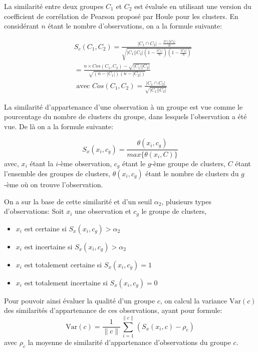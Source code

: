 \documentclass[12pt, french, latin.medieval, a4paper]{report}
\begin{document}
	La similarité entre deux groupes $C_1$ et $C_2$ est évaluée en utilisant une version du coefficient de corrélation de Pearson proposé par Houle \cite{houle2008relevant} pour les clusters.  
	En considérant $n$ étant le nombre d'observations, on a la formule suivante:
    
	\begin{equation}
    	\begin{split}
        	& S_c(C_1,C_2) = \frac{ | C_1 \cap C_2 | - \frac{| C_1 | | C_2 |}{n} }{\sqrt{ | C_1 | | C_2 | \left( 1 - \frac{| C_1 |}{n} \right)\left( 1 - \frac{| C_2 |}{n} \right) }}
        	\\
        	& = \frac{ n \times Cos(C_1 , C_2) - \sqrt{| C_1 | | C_2 |} }{\sqrt{ \left( n - | C_1 | \right)\left( n - | C_2 | \right) }}
        	\\
        	& \text{ avec $Cos(C_1, C_2) = \frac{| C_1 \cap C_2 |}{ \sqrt{| C_1 | | C_2 |} }$}
    	\end{split}
    	\label{equa:ace1}
	\end{equation}

	La similarité d'appartenance d'une observation à un groupe est vue comme le pourcentage du nombre de clusters du groupe, dans lesquels l'observation a été vue.
	De là on a la formule suivante:
   	 
	\begin{equation}
    	S_x(x_i,c_g) = \frac{\theta(x_i, c_g)}{ max\{ \theta(x_i, C) \} }
    	\label{equa:ace2}
	\end{equation}
	avec, $x_i$ étant la $i$-ème observation, $c_g$ étant le $g$-ème groupe de clusters, $C$ étant l'ensemble des groupes de clusters, $\theta(x_i, c_g)$ étant le nombre de clusters du $g$-ème où on trouve l'observation.

	On a sur la base de cette similarité et d'un seuil $\alpha_2$, plusieurs types d'observations:
	Soit $x_i$ une observation et $c_g$ le groupe de clusters,
	\begin{itemize}
    	\item $x_i$ est certaine si $S_x(x_i,c_g) > \alpha_2$
    	\item $x_i$ est incertaine si $S_x(x_i,c_g) > \alpha_2$
    	\item $x_i$ est totalement certaine si $S_x(x_i,c_g) = 1$
    	\item $x_i$ est totalement incertaine si $S_x(x_i,c_g) = 0$
	\end{itemize}

	Pour pouvoir ainsi évaluer la qualité d'un groupe $c$, on calcul la variance $\text{Var}(c)$ des similarités d'appartenance de ces observations, ayant pour formule:
	\begin{equation}
    	\text{Var}(c) = \frac{1}{ \|c\|} \sum_{i=1}^{\|c\|} (S_x(x_i,c) - \rho_c)
    	\label{equa:ace3}
	\end{equation}
	avec $\rho_c$ la moyenne de similarité d'appartenance d'observations du groupe $c$.
    
\end{document}
